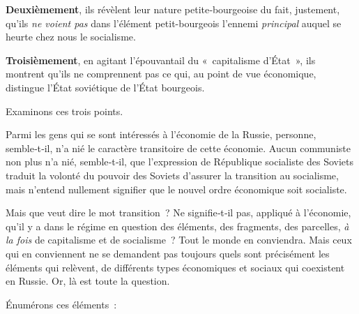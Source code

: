 \documentclass[french,twoside]{book} %
\begin{document}
\textbf{Deuxièmement}, ils révèlent leur nature petite‑bourgeoise du fait, justement, qu’ils \emph{ne voient pas} dans l’élément petit-bourgeois l’ennemi \emph{principal} auquel se heurte chez nous le socialisme.\par
\textbf{Troisièmement}, en agitant l’épouvantail du « capitalisme d’État », ils montrent qu’ils ne comprennent pas ce qui, au point de vue économique, distingue l’État soviétique de l’État bourgeois.\par
Examinons ces trois points.\par
Parmi les gens qui se sont intéressés à l’économie de la Russie, personne, semble‑t‑il, n’a nié le caractère transitoire de cette économie. Aucun communiste non plus n’a nié, semble‑t‑il, que l’expression de République socialiste des Soviets traduit la volonté du pouvoir des Soviets d’assurer la transition au socialisme, mais n’entend nullement signifier que le nouvel ordre économique soit socialiste.\par
Mais que veut dire le mot transition ? Ne signifie‑t‑il pas, appliqué à l’économie, qu’il y a dans le régime en question des éléments, des fragments, des parcelles, \emph{à la fois} de capitalisme et de socialisme ? Tout le monde en conviendra. Mais ceux qui en conviennent ne se demandent pas toujours quels sont précisément les éléments qui relèvent, de différents types économiques et sociaux qui coexistent en Russie. Or, là est toute la question.\par
Énumérons ces éléments :\par
\end{document}
